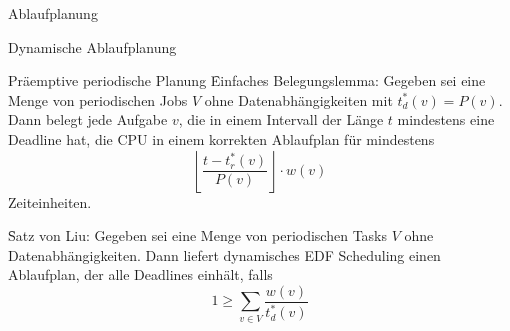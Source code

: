 \begin{chapter}{Ablaufplanung}
\begin{section}{Dynamische Ablaufplanung}
\begin{subsection}{Präemptive periodische Planung}
   \f{Einfaches Belegungslemma:} Gegeben sei eine Menge von periodischen Jobs $V$ ohne Datenabhängigkeiten mit $t_d^*(v)=P(v)$. Dann belegt jede Aufgabe $v$, die in einem Intervall der Länge $t$ mindestens eine Deadline hat, die CPU in einem korrekten Ablaufplan für mindestens
   \[ \left\lfloor \frac{t-t_r^*(v)}{P(v)} \right\rfloor \cdot w(v) \]
   Zeiteinheiten.
   
   \f{Satz von Liu:} Gegeben sei eine Menge von periodischen Tasks $V$ ohne Datenabhängigkeiten. Dann liefert dynamisches EDF Scheduling einen Ablaufplan, der alle Deadlines einhält, falls
   \[ 1 \geq \sum_{v\in V} \frac{w(v)}{t_d^*(v)} \]
  \end{subsection}
  \end{section}
\end{chapter}
